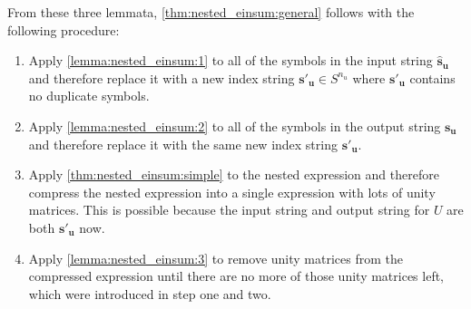 

From these three lemmata, \cref{thm:nested_einsum:general} follows with the following procedure:
\begin{enumerate}[label={\arabic*.}]
    \item Apply \cref{lemma:nested_einsum:1} to all of the symbols in the input string $\bm{\hat{s}_u}$ and therefore replace it with a new index string $\bm{s'_u} \in S^{n_u}$ where $\bm{s'_u}$ contains no duplicate symbols.
    \item Apply \cref{lemma:nested_einsum:2} to all of the symbols in the output string $\bm{s_u}$ and therefore replace it with the same new index string $\bm{s'_u}$.
    \item Apply \cref{thm:nested_einsum:simple} to the nested expression and therefore compress the nested expression into a single expression with lots of unity matrices.
          This is possible because the input string and output string for $U$ are both $\bm{s'_u}$ now.
    \item Apply \cref{lemma:nested_einsum:3} to remove unity matrices from the compressed expression until there are no more of those unity matrices left, which were introduced in step one and two.
\end{enumerate}

